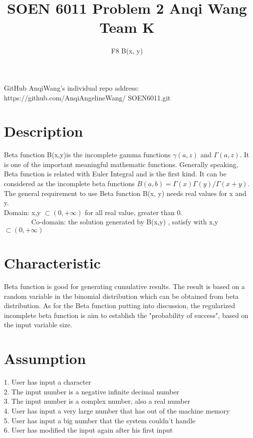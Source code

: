 \documentclass{article}
\title{SOEN 6011 Problem 2 Anqi Wang Team K }
\begin{document}
\author{F8 B(x, y)}
\maketitle
{GitHub AnqiWang's individual repo address: https://github.com/AnqiAngelineWang/
SOEN6011.git
}



\section{Description}
Beta function B(x,y)is the incomplete gamma functions $ \gamma (a,z) $ and $\Gamma(a,z)$. It is one of the important meaningful mathematic functions. Generally speaking, Beta function is related with Euler Integral and is the first kind. It can be considered as the incomplete beta functions $B (a,b) =  \Gamma(x) \Gamma(y)  / \Gamma( x+y) $. 
The general requirement to use Beta function B(x, y) needs real values for x and y.  \\


Domain: x,y $ \subset (0, + \infty)$  for all real value, greater than 0. \\
 \ \ \ \ \ \ \ \ Co-domain: the solution generated by B(x,y) , satisfy with  x,y $ \subset (0, + \infty)$ 
 
\section{Characteristic}
Beta function is good for generating cumulative results. The result is based on a random variable in the binomial distribution which can be obtained from beta distribution.  As for the Beta function putting into discussion, the regularized incomplete beta function is aim to establish the "probability of success", based on the input variable size. 

\section{Assumption}
1.	User has input a character \\
2.	The input number is a negative infinite decimal number \\
3.	The input number is a complex number, also a real number \\
4.	User has input a very large number that has out of the machine memory \\
5.	User has input a big number that the system couldn’t handle \\
6.  User has modified the input again after his first input\\ 
\end{document}
